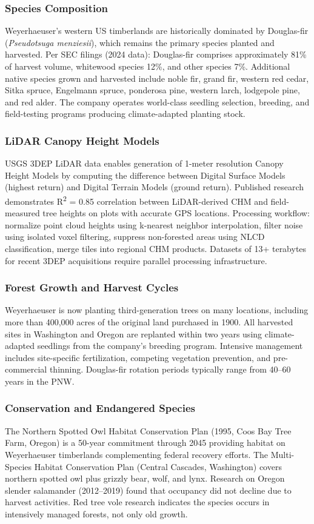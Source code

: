 \documentclass[11pt,letterpaper]{article}
\begin{document}
\subsubsection{Species Composition}
Weyerhaeuser's western US timberlands are historically dominated by Douglas-fir (\emph{Pseudotsuga menziesii}), which remains the primary species planted and harvested. Per SEC filings (2024 data): Douglas-fir comprises approximately 81\% of harvest volume, whitewood species 12\%, and other species 7\%. Additional native species grown and harvested include noble fir, grand fir, western red cedar, Sitka spruce, Engelmann spruce, ponderosa pine, western larch, lodgepole pine, and red alder. The company operates world-class seedling selection, breeding, and field-testing programs producing climate-adapted planting stock.

\subsubsection{LiDAR Canopy Height Models}
USGS 3DEP LiDAR data enables generation of 1-meter resolution Canopy Height Models by computing the difference between Digital Surface Models (highest return) and Digital Terrain Models (ground return). Published research demonstrates R\textsuperscript{2} = 0.85 correlation between LiDAR-derived CHM and field-measured tree heights on plots with accurate GPS locations. Processing workflow: normalize point cloud heights using k-nearest neighbor interpolation, filter noise using isolated voxel filtering, suppress non-forested areas using NLCD classification, merge tiles into regional CHM products. Datasets of 13+ terabytes for recent 3DEP acquisitions require parallel processing infrastructure.

\subsubsection{Forest Growth and Harvest Cycles}
Weyerhaeuser is now planting third-generation trees on many locations, including more than 400,000 acres of the original land purchased in 1900. All harvested sites in Washington and Oregon are replanted within two years using climate-adapted seedlings from the company's breeding program. Intensive management includes site-specific fertilization, competing vegetation prevention, and pre-commercial thinning. Douglas-fir rotation periods typically range from 40--60 years in the PNW.

\subsubsection{Conservation and Endangered Species}
The Northern Spotted Owl Habitat Conservation Plan (1995, Coos Bay Tree Farm, Oregon) is a 50-year commitment through 2045 providing habitat on Weyerhaeuser timberlands complementing federal recovery efforts. The Multi-Species Habitat Conservation Plan (Central Cascades, Washington) covers northern spotted owl plus grizzly bear, wolf, and lynx. Research on Oregon slender salamander (2012--2019) found that occupancy did not decline due to harvest activities. Red tree vole research indicates the species occurs in intensively managed forests, not only old growth.
\end{document}
